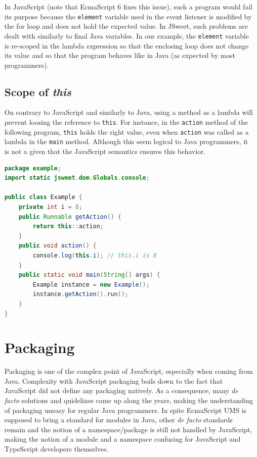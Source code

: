 \documentclass[a4paper]{report}
\begin{document}
In JavaScript (note that EcmaScript 6 fixes this issue), such a program would fail its purpose because the \texttt{element} variable used in the event listener is modified by the for loop and does not hold the expected value. In JSweet, such problems are dealt with similarly to final Java variables. In our example, the \texttt{element} variable is re-scoped in the lambda expression so that the enclosing loop does not change its value and so that the program behaves like in Java (as expected by most programmers).

\section{Scope of \emph{this}}

On contrary to JavaScript and similarly to Java, using a method as a lambda will prevent loosing the reference to \texttt{this}. For instance, in the \texttt{action} method of the following program, \texttt{this} holds the right value, even when \texttt{action} was called as a lambda in the \texttt{main} method. Although this seem logical to Java programmers, it is not a given that the JavaScript semantics ensures this behavior. 

\begin{lstlisting}[language=Java]
package example;
import static jsweet.dom.Globals.console;

public class Example {
	private int i = 8;
	public Runnable getAction() {
		return this::action;
	}
	public void action() {
		console.log(this.i); // this.i is 8
	}
	public static void main(String[] args) {
		Example instance = new Example();
		instance.getAction().run();
	}
}
\end{lstlisting}

\chapter{Packaging}
\label{packaging}

Packaging is one of the complex point of JavaScript, especially when coming from Java. Complexity with JavaScript packaging boils down to the fact that JavaScript did not define any packaging natively. As a consequence, many \emph{de facto} solutions and quidelines came up along the years, making the understanding of packaging uneasy for regular Java programmers. In spite EcmaScript UMS is supposed to bring a standard for modules in Java, other \emph{de facto} standards remain and the notion of a namespace/package is still not handled by JavaScript, making the notion of a module and a namespace confusing for JavaScript and TypeScript developers themselves.
\end{document}
